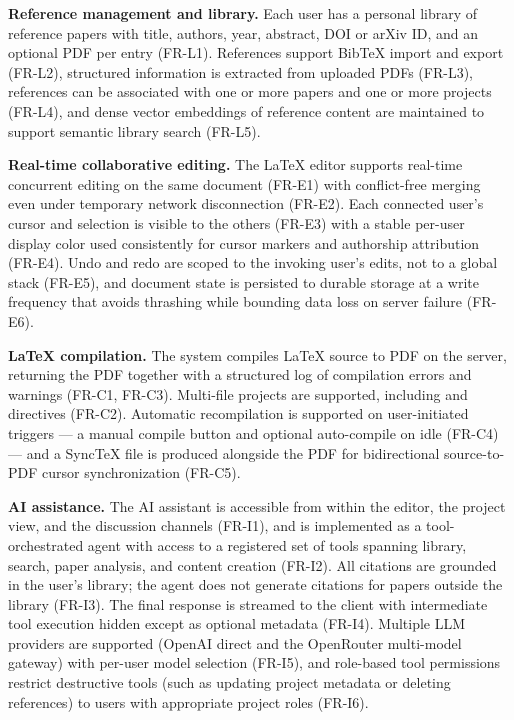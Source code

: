 \textbf{Reference management and library.} Each user has a personal library of reference papers with title, authors, year, abstract, DOI or arXiv ID, and an optional PDF per entry (FR-L1). References support BibTeX import and export (FR-L2), structured information is extracted from uploaded PDFs (FR-L3), references can be associated with one or more papers and one or more projects (FR-L4), and dense vector embeddings of reference content are maintained to support semantic library search (FR-L5).

\textbf{Real-time collaborative editing.} The LaTeX editor supports real-time concurrent editing on the same document (FR-E1) with conflict-free merging even under temporary network disconnection (FR-E2). Each connected user's cursor and selection is visible to the others (FR-E3) with a stable per-user display color used consistently for cursor markers and authorship attribution (FR-E4). Undo and redo are scoped to the invoking user's edits, not to a global stack (FR-E5), and document state is persisted to durable storage at a write frequency that avoids thrashing while bounding data loss on server failure (FR-E6).

\textbf{LaTeX compilation.} The system compiles LaTeX source to PDF on the server, returning the PDF together with a structured log of compilation errors and warnings (FR-C1, FR-C3). Multi-file projects are supported, including \verb|| and \verb|| directives (FR-C2). Automatic recompilation is supported on user-initiated triggers --- a manual compile button and optional auto-compile on idle (FR-C4) --- and a SyncTeX file is produced alongside the PDF for bidirectional source-to-PDF cursor synchronization (FR-C5).

\textbf{AI assistance.} The AI assistant is accessible from within the editor, the project view, and the discussion channels (FR-I1), and is implemented as a tool-orchestrated agent with access to a registered set of tools spanning library, search, paper analysis, and content creation (FR-I2). All citations are grounded in the user's library; the agent does not generate citations for papers outside the library (FR-I3). The final response is streamed to the client with intermediate tool execution hidden except as optional metadata (FR-I4). Multiple LLM providers are supported (OpenAI direct and the OpenRouter multi-model gateway) with per-user model selection (FR-I5), and role-based tool permissions restrict destructive tools (such as updating project metadata or deleting references) to users with appropriate project roles (FR-I6).

